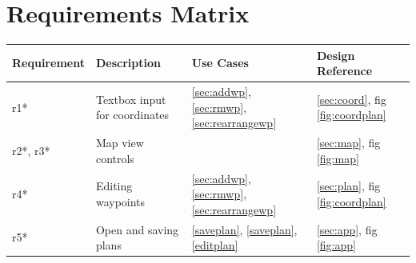 \documentclass[12pt, letterpaper]{article}
\begin{document}
\section{Requirements Matrix}\label{sec:matrix}

\begin{tabularx}{\textwidth}{l X l l}
  \hline
\textbf{Requirement} & \textbf{Description} & \textbf{Use Cases} & \textbf{Design Reference}\\
\hline
\hline
r1* & Textbox input for coordinates & \ref{sec:addwp}, \ref{sec:rmwp}, \ref{sec:rearrangewp} & \ref{sec:coord}, fig \ref{fig:coordplan} \\
r2*, r3* & Map view controls & & \ref{sec:map}, fig \ref{fig:map}\\
r4* & Editing waypoints &  \ref{sec:addwp}, \ref{sec:rmwp}, \ref{sec:rearrangewp} & \ref{sec:plan}, fig \ref{fig:coordplan}\\
r5* & Open and saving plans & \ref{saveplan}, \ref{saveplan}, \ref{editplan} & \ref{sec:app}, fig \ref{fig:app}\\
\hline

\end{tabularx}
\newpage
\appendix
{}
{}
\nocite{*}

\newpage
{}

\end{document}
